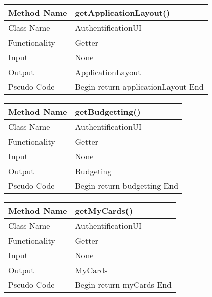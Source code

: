 \documentclass{article}
\newcommand\tab[1][1cm]{\hspace*{#1}}
\begin{document}
\begin{center}
\begin{tabular}{|p{2.5cm}||p{10cm}|}
\hline
Method Name & getApplicationLayout() \\
\hline
Class Name & AuthentificationUI \\
\hline
Functionality & Getter\\
\hline

Input & None\\
\hline
Output & ApplicationLayout\\
\hline

Pseudo Code & Begin\newline
\tab return applicationLayout\newline
End \\
\hline
\end{tabular}
\end{center}

\begin{center}
\begin{tabular}{|p{2.5cm}||p{10cm}|}
\hline
Method Name & getBudgetting() \\
\hline
Class Name & AuthentificationUI \\
\hline
Functionality & Getter\\
\hline

Input & None\\
\hline
Output & Budgeting\\
\hline

Pseudo Code & Begin\newline
\tab return budgetting\newline
End \\
\hline
\end{tabular}
\end{center}

\begin{center}
\begin{tabular}{|p{2.5cm}||p{10cm}|}
\hline
Method Name & getMyCards() \\
\hline
Class Name & AuthentificationUI \\
\hline
Functionality & Getter\\
\hline

Input & None\\
\hline
Output & MyCards\\
\hline

Pseudo Code & Begin\newline
\tab return myCards\newline
End \\
\hline
\end{tabular}
\end{center}
\end{document}
